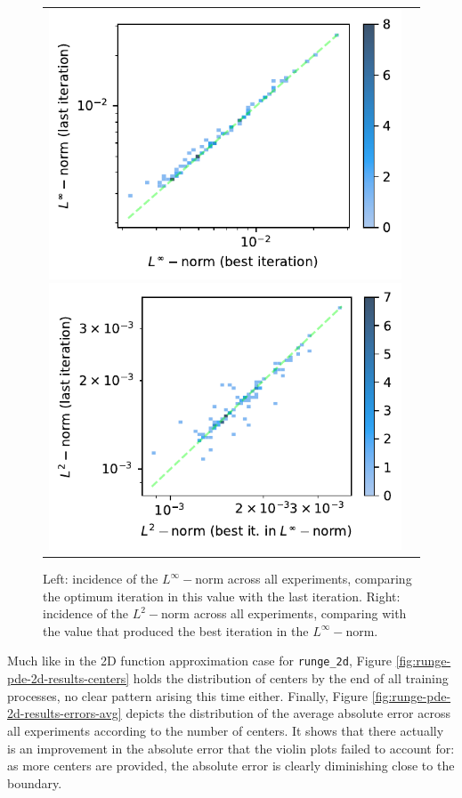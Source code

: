 \documentclass[12pt]{report} %
\begin{document}
\begin{figure}
  \hspace*{-2cm}
  \begin{tabular}{cc}
    \includegraphics[width=.6\textwidth]{imagenes/experiments/2d/pde_runge_2d/incidence_of_linf_runge_2d.pdf}
    \includegraphics[width=.6\textwidth]{imagenes/experiments/2d/pde_runge_2d/incidence_of_l2_runge_2d.pdf}
  \end{tabular}
  \caption{Left: incidence of the $L^\infty-$norm across all experiments, comparing the optimum iteration in this value with the last iteration. Right: incidence of the $L^2-$norm across all experiments, comparing with the value that produced the best iteration in the $L^\infty-$norm.}
  \label{fig:runge-pde-2d-results-incidence-l-norms}
\end{figure}

Much like in the 2D function approximation case for \texttt{runge\_2d}, Figure \ref{fig:runge-pde-2d-results-centers} holds the distribution of centers by the end of all training processes, no clear pattern arising this time either. Finally, Figure \ref{fig:runge-pde-2d-results-errors-avg} depicts the distribution of the average absolute error across all experiments according to the number of centers. It shows that there actually is an improvement in the absolute error that the violin plots failed to account for: as more centers are provided, the absolute error is clearly diminishing close to the boundary.
\end{document}
